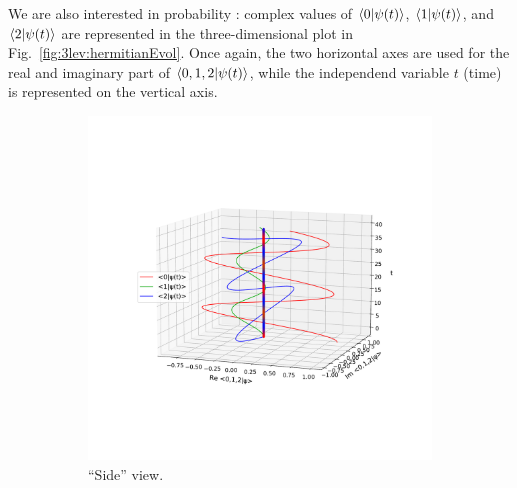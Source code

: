 We are also interested in probability :
complex values of
$\braket{0}{\psi(t)}$, 
$\braket{1}{\psi(t)}$, and
$\braket{2}{\psi(t)}$
are represented in the three-dimensional
plot in Fig.~\ref{fig:3lev:hermitianEvol}.
Once again, the two horizontal axes are used for the real and imaginary part of
$\braket{0, 1, 2}{\psi(t)}$,
while the independend variable $t$ (time) is represented on the vertical axis.
\begin{figure}[h]
  \begin{subfigure}[t]{\textwidth}
    \centering
    \includegraphics[height=0.45\textheight,clip,trim=80 180 40 140]{img/3ldetect/hermitianSpaceTime_side.pdf}
    \caption{``Side'' view.}
  \end{subfigure}
  \par\bigskip
  \begin{subfigure}[b]{\textwidth}
    \centering

\end{subfigure}
\end{figure}
